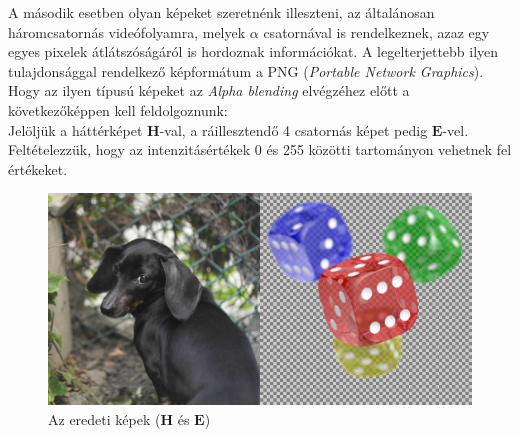 A második esetben olyan képeket szeretnénk illeszteni, az általánosan háromcsatornás videófolyamra, melyek $\alpha$ csatornával is rendelkeznek, azaz egy egyes pixelek átlátszóságáról is hordoznak információkat. A legelterjettebb ilyen tulajdonsággal rendelkező képformátum a PNG (\textit{Portable Network Graphics}). Hogy az ilyen típusú képeket az \textit{Alpha blending} elvégzéhez előtt a következőképpen kell feldolgoznunk:\\
Jelöljük a háttérképet $\boldsymbol H$-val, a ráillesztendő 4 csatornás képet pedig $\boldsymbol E$-vel. Feltételezzük, hogy az intenzitásértékek 0 és 255 közötti tartományon vehetnek fel értékeket.
\begin{figure}[h]
	\centering
	\includegraphics[width=6.82truecm, height=3.41truecm]{images/blending_01.png}
	\caption{Az eredeti képek ($\boldsymbol H$ és  $\boldsymbol E$)}
	\label{fig:blend01}
\end{figure}	
